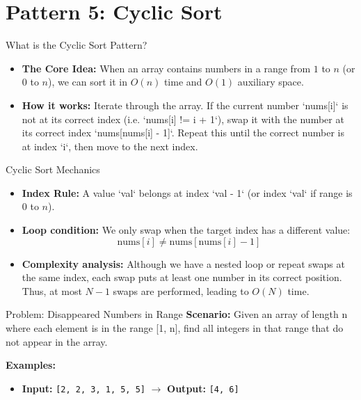 \section{Pattern 5: Cyclic Sort}

\begin{frame}[c]{\empty}
    \begin{center}
        \Large\textbf{\secname}
    \end{center}
\end{frame}

\begin{frame}{What is the Cyclic Sort Pattern?}
  \begin{itemize}
    \item \textbf{The Core Idea:} When an array contains numbers in a range from $1$ to $n$ (or $0$ to $n$), we can sort it in $O(n)$ time and $O(1)$ auxiliary space.
    \item \textbf{How it works:} Iterate through the array. If the current number `nums[i]` is not at its correct index (i.e. `nums[i] != i + 1`), swap it with the number at its correct index `nums[nums[i] - 1]`. Repeat this until the correct number is at index `i`, then move to the next index.
  \end{itemize}
\end{frame}

\begin{frame}{Cyclic Sort Mechanics}
  \begin{itemize}
    \item \textbf{Index Rule:} A value `val` belongs at index `val - 1` (or index `val` if range is $0$ to $n$).
    \item \textbf{Loop condition:} We only swap when the target index has a different value:
      $$\text{nums}[i] \neq \text{nums}[\text{nums}[i] - 1]$$
    \item \textbf{Complexity analysis:} Although we have a nested loop or repeat swaps at the same index, each swap puts at least one number in its correct position. Thus, at most $N-1$ swaps are performed, leading to $O(N)$ time.
  \end{itemize}
\end{frame}

\begin{frame}[fragile]{Problem: Disappeared Numbers in Range}
  \textbf{Scenario:}
  Given an array of length n where each element is in the range [1, n], find all integers in that range that do not appear in the array.
  
  \vspace{0.3cm}
  \textbf{Examples:}
  \begin{itemize}
    \item \textbf{Input:} \texttt{[2, 2, 3, 1, 5, 5]} $\rightarrow$ \textbf{Output:} \texttt{[4, 6]}
  \end{itemize}
\end{frame}

